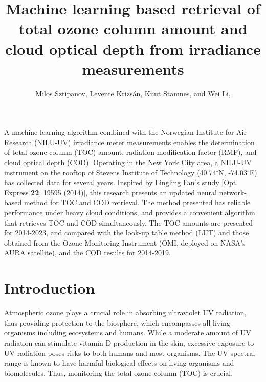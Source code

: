 \documentclass{optica-article}
\begin{document}
\title{Machine learning based retrieval of total ozone column amount and cloud optical depth from irradiance measurements}

\author{Milos Sztipanov, Levente Krizs\'an, Knut Stamnes,  and Wei Li, }

\address{Department of Physics, Stevens Institute of Technology, Hoboken, New Jersey, USA\\}



\begin{abstract*} 
A machine learning algorithm combined with the Norwegian Institute for Air Research (NILU-UV) irradiance meter measurements enables the determination of total ozone column (TOC) amount, radiation modification factor (RMF), and cloud optical depth (COD). 
Operating in the New York City area, a NILU-UV instrument on the rooftop of Stevens Institute of Technology (40.74$^\circ$N, -74.03$^\circ$E) has collected data for several years. 
Inspired by Lingling Fan's study [Opt. Express \textbf{22}, 19595 (2014)], this research presents an updated neural network-based method for TOC and COD retrieval.
The method presented has reliable performance under heavy cloud conditions, and provides a convenient algorithm that retrieves TOC and COD simultaneously.  
The TOC amounts are presented for 2014-2023, and compared with the look-up table method (LUT) and those obtained from the Ozone Monitoring Instrument (OMI, deployed on NASA's AURA satellite), and the COD results for 2014-2019.


\end{abstract*}

\section{Introduction}
\label{sec-intro}
Atmospheric ozone plays a crucial role in absorbing ultraviolet UV radiation, thus providing protection to the biosphere, which encompasses all living organisms including ecosystems and humans.
While a moderate amount of UV radiation can stimulate vitamin D production in the skin, excessive exposure to UV radiation poses risks to both humans and most organisms. 
The UV spectral range is known to have harmful biological effects on living organisms and biomolecules. 
Thus, monitoring the total ozone column (TOC) is crucial. 
\end{document}
